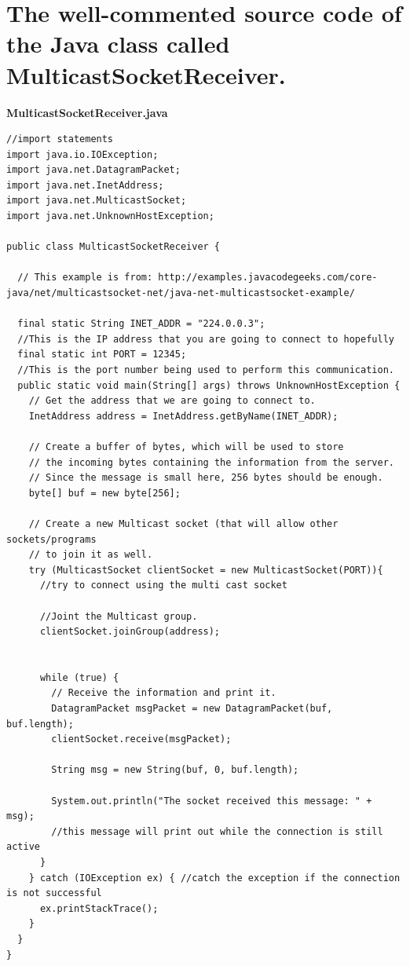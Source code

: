 \documentclass{article}
\begin{document}
\section{The well-commented source code of the Java class called MulticastSocketReceiver.}
\textbf{MulticastSocketReceiver.java}
\begin{lstlisting}
//import statements
import java.io.IOException;
import java.net.DatagramPacket;
import java.net.InetAddress;
import java.net.MulticastSocket;
import java.net.UnknownHostException;

public class MulticastSocketReceiver {

  // This example is from: http://examples.javacodegeeks.com/core-java/net/multicastsocket-net/java-net-multicastsocket-example/

  final static String INET_ADDR = "224.0.0.3";
  //This is the IP address that you are going to connect to hopefully
  final static int PORT = 12345;
  //This is the port number being used to perform this communication.
  public static void main(String[] args) throws UnknownHostException {
    // Get the address that we are going to connect to.
    InetAddress address = InetAddress.getByName(INET_ADDR);

    // Create a buffer of bytes, which will be used to store
    // the incoming bytes containing the information from the server.
    // Since the message is small here, 256 bytes should be enough.
    byte[] buf = new byte[256];

    // Create a new Multicast socket (that will allow other sockets/programs
    // to join it as well.
    try (MulticastSocket clientSocket = new MulticastSocket(PORT)){
      //try to connect using the multi cast socket

      //Joint the Multicast group.
      clientSocket.joinGroup(address);


      while (true) {
        // Receive the information and print it.
        DatagramPacket msgPacket = new DatagramPacket(buf, buf.length);  
        clientSocket.receive(msgPacket);

        String msg = new String(buf, 0, buf.length);

        System.out.println("The socket received this message: " + msg);
        //this message will print out while the connection is still active
      }
    } catch (IOException ex) { //catch the exception if the connection is not successful
      ex.printStackTrace();
    }
  }
}
\end{lstlisting}
\end{document}
